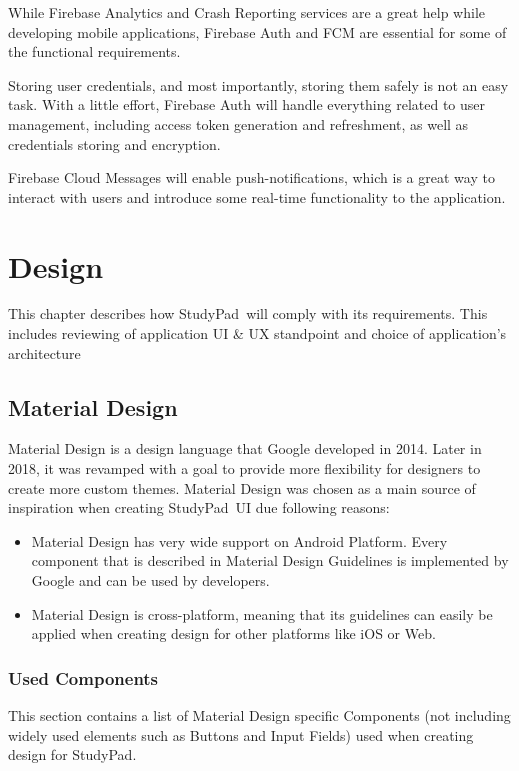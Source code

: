 \documentclass[thesis=B,english]{FITthesis}[2012/10/20]
\newcommand{\appname}{StudyPad}
\begin{document}
\noindent While Firebase Analytics and Crash Reporting services are a great help while developing mobile applications, Firebase Auth and FCM are essential for some of the functional requirements. 

Storing user credentials, and most importantly, storing them safely is not an easy task. With a little effort, Firebase Auth will handle everything related to user management, including access token generation and refreshment, as well as credentials storing and encryption.

Firebase Cloud Messages will enable push-notifications, which is a great way to interact with users and introduce some real-time functionality to the application. 

	
\chapter{Design}

This chapter describes how \appname\ will comply with its requirements. This includes reviewing of application UI \& UX standpoint and choice of application's architecture

\section{Material Design}
Material Design is a design language that Google developed in 2014. Later in 2018, it was revamped with a goal to provide more flexibility for designers to create more custom themes. Material Design was chosen as a main source of inspiration when creating \appname\ UI due following  reasons:
\begin{itemize}
	\item Material Design has very wide support on Android Platform. Every component that is described in Material Design Guidelines is implemented by Google and can be used by developers.
	\item Material Design is cross-platform, meaning that its guidelines can easily be applied when creating design for other platforms like iOS or Web.
\end{itemize}



\subsection{Used Components}
This section contains a list of Material Design specific Components (not including widely used elements such as Buttons and Input Fields) used when creating design for \appname.
\end{document}
